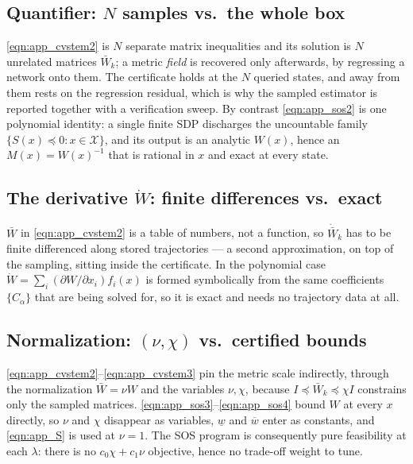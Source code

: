 \documentclass[lettersize,journal]{IEEEtran}
\begin{document}
\subsection{Quantifier: $N$ samples vs.\ the whole box}
\eqref{eqn:app_cvstem2} is $N$ separate matrix inequalities and its solution is
$N$ unrelated matrices $\bar W_k$; a metric \emph{field} is recovered only
afterwards, by regressing a network onto them. The certificate holds at the $N$
queried states, and away from them rests on the regression residual, which is
why the sampled estimator is reported together with a verification sweep. By
contrast \eqref{eqn:app_sos2} is one polynomial identity: a single finite SDP
discharges the uncountable family $\{S(x)\preceq0 : x\in\mathcal{X}\}$, and its
output is an analytic $W(x)$, hence an $M(x)=W(x)^{-1}$ that is rational in $x$
and exact at every state.

\subsection{The derivative $\dot W$: finite differences vs.\ exact}
$\bar W$ in \eqref{eqn:app_cvstem2} is a table of numbers, not a function, so
$\dot{\bar W}_k$ has to be finite differenced along stored trajectories --- a
second approximation, on top of the sampling, sitting inside the certificate.
In the polynomial case $\dot W=\sum_i(\partial W/\partial x_i)f_i(x)$ is formed
symbolically from the same coefficients $\{C_\alpha\}$ that are being solved
for, so it is exact and needs no trajectory data at all.

\subsection{Normalization: $(\nu,\chi)$ vs.\ certified bounds}
\eqref{eqn:app_cvstem2}--\eqref{eqn:app_cvstem3} pin the metric scale
indirectly, through the normalization $\bar W = \nu W$ and the variables
$\nu,\chi$, because $I \preceq \bar W_k \preceq \chi I$ constrains only the
sampled matrices. \eqref{eqn:app_sos3}--\eqref{eqn:app_sos4} bound $W$ at every
$x$ directly, so $\nu$ and $\chi$ disappear as variables, $\underline w$ and
$\overline w$ enter as constants, and \eqref{eqn:app_S} is used at $\nu=1$. The
SOS program is consequently pure feasibility at each $\lambda$: there is no
$c_0\chi+c_1\nu$ objective, hence no trade-off weight to tune.
\end{document}
